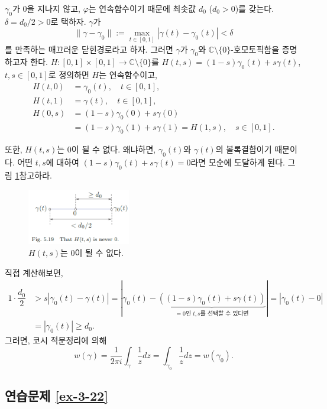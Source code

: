 \begin{itemize}
$\gamma_0$가 $0$을 지나지 않고, $\varphi$는 연속함수이기 때문에
최솟값 $d_0$ ($d_0>0$)를 갖는다.
$\delta = d_0/2 >0$로 택하자.
$\gamma$가 
\[
\|\gamma - \gamma_0\| := \max_{t\in[0,1]} | \gamma(t) - \gamma_0(t)| < \delta
\]
를 만족하는 매끄러운 닫힌경로라고 하자.
그러면
$\gamma$가 $\gamma_0$와 $\mathbb C\setminus \{0\}$-호모토픽함을 증명하고자 한다.
$H:[0,1]\times[0,1]\to \mathbb C\setminus\{0\}$를 
$H(t,s) = (1-s)\gamma_0(t) + s\gamma(t)$, $t,s\in[0,1]$로 정의하면
$H$는 연속함수이고,
\begin{align*}
H(t,0) &= \gamma_0(t), \quad t\in[0,1],\\
H(t,1) &= \gamma(t), \quad t\in[0,1],\\
H(0,s) &= (1-s)\gamma_0(0) + s\gamma(0) \\
&= (1-s)\gamma_0(1) + s\gamma(1)  = H(1,s), \quad s\in[0,1].
\end{align*}

또한, $H(t,s)$는 $0$이 될 수 없다. 왜냐하면,
$\gamma_0(t)$와 $\gamma(t)$의 볼록결합이기 때문이다.
어떤 $t,s$에 대하여 $(1-s)\gamma_0(t)+s\gamma(t)=0$라면
모순에 도달하게 된다. 그림 \ref{fig-5-19}\를 참고하라.

\begin{figure}[h!]
\begin{center}
\includegraphics[width=0.4\textwidth]{./Solution/figs/fig-5-19}
\end{center}
\caption{$H(t,s)$는 $0$이 될 수 없다.}
\label{fig-5-19}
\end{figure}
직접 계산해보면,
\begin{align*}
1\cdot \dfrac{d_0}2 &> s|\gamma_0(t) - \gamma(t)|
= | \gamma_0(t) - 
\underbrace{((1-s)\gamma_0(t) + s\gamma(t))}_{=0\text{인 $t,s$를 선택할 수 있다면}}
| = |\gamma_0(t) - 0| \\
&= |\gamma_0(t)| \ge d_0.
\end{align*}
그러면, 코시 적분정리에 의해
\[
w(\gamma) = \dfrac1{2\pi i} \int_\gamma \dfrac1z dz 
= \int_{\gamma_0} \dfrac1z dz  = w(\gamma_0).
\]
\end{itemize}

\subsection*{연습문제 \ref{ex-3-22}}

